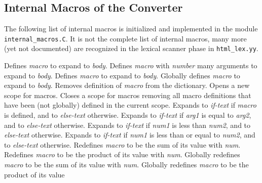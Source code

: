 \documentclass[11pt]{article}
\begin{document}
\subsection{Internal Macros of the Converter}

The following list of internal macros is initialized and implemented
in the module {\tt internal\_macros.C}. It is not the complete list of
internal macros, many more (yet not documented) are recognized in the
lexical scanner phase in {\tt html\_lex.yy}.

\begin{description}
    Defines {\em macro\/} to expand to {\em body}.
    Defines {\em macro\/} with {\em number\/} many arguments to expand to
    {\em body}.
    Defines {\em macro\/} to expand to {\em body}.
    Globally defines {\em macro\/} to expand to {\em body}.
    Removes definition of {\em macro\/} from the dictionary.
    Opens a new scope for macros.
    Closes a scope for macros removing all macro definitions that 
    have been (not globally) defined in the current scope.
    Expands to {\em if-text\/} if {\em macro\/} is defined, and to
    {\em else-text\/} otherwise.
    Expands to {\em if-text\/} if {\em arg1\/} is equal to {\em arg2}, and to
    {\em else-text\/} otherwise.
    Expands to {\em if-text\/} if {\em num1\/} is less than {\em num2}, and to
    {\em else-text\/} otherwise.
    Expands to {\em if-text\/} if {\em num1\/} is less than or equal 
    to {\em num2}, and to {\em else-text\/} otherwise.
    Redefines {\em macro\/} to be the sum of its value with {\em num}.
    Redefines {\em macro\/} to be the product of its value with {\em num}.
    Globally redefines {\em macro\/} to be the sum of its value with {\em num}.
    Globally redefines {\em macro\/} to be the product of its value 

\end{description}
\end{document}
